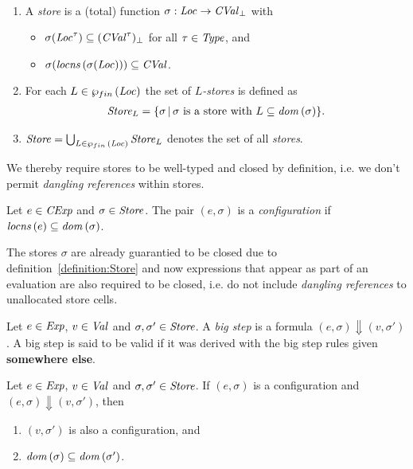 \documentclass[12pt,a4paper]{report}
\newcommand{\CExp}{\nstyle{CExp}}
\newcommand{\CVal}{\nstyle{CVal}}
\begin{document}
\begin{definition}[Store] \label{definition:Store} \
  \begin{enumerate}
    \item A {\em store} is a (total) function $\sigma:\Loc \to \CVal_\bot$ with
          \begin{itemize}
            \item $\sigma(\Loc^\tau) \subseteq (\CVal^\tau)_\bot$ for all $\tau \in \mathit{Type}$, and
            \item $\sigma(\locns{\sigma(\Loc)}) \subseteq \CVal$.
          \end{itemize}

    \item For each $L\in\wp_{fin}\,(\mathit{Loc})$ the set of {\em $L$-stores} is defined as
          \[\begin{array}{l}
            \mathit{Store}_L = \{\sigma\,|\,\text{$\sigma$ is a store with $L\subseteq\mathit{dom}\,(\sigma)$}\}.
          \end{array}\]

    \item $\mathit{Store} = \bigcup_{L\in\wp_{fin}\,(\mathit{Loc})} \mathit{Store}_L$ denotes the set of all {\em stores}.
  \end{enumerate}
\end{definition}

We thereby require stores to be well-typed and closed by definition, i.e. we don't permit {\em dangling
references} within stores.

\begin{definition}[Configuration]
  Let $e\in\CExp$ and $\sigma\in\mathit{Store}$. The pair $(e,\sigma)$ is a {\em configuration}
  if $\mathit{locns}\,(e) \subseteq \mathit{dom}\,(\sigma)$.
\end{definition}

The stores $\sigma$ are already guarantied to be closed due to definition~\ref{definition:Store} and
now expressions that appear as part of an evaluation are also required to be closed, i.e. do not
include {\em dangling references} to unallocated store cells.

\begin{definition}
  Let $e\in\mathit{Exp}$, $v\in\mathit{Val}$ and $\sigma,\sigma'\in\mathit{Store}$. A {\em big step} is a formula
  $(e,\sigma) \Downarrow (v,\sigma')$. A big step is said to be valid if it was derived with the
  big step rules given {\bf somewhere else}.
\end{definition}

\begin{corollary}
  Let $e\in\mathit{Exp}$, $v\in\mathit{Val}$ and $\sigma,\sigma'\in\mathit{Store}$. If $(e,\sigma)$ is a configuration
  and $(e,\sigma) \Downarrow (v,\sigma')$, then
  \begin{enumerate}
    \item $(v,\sigma')$ is also a configuration, and
    \item $\mathit{dom}\,(\sigma) \subseteq \mathit{dom}\,(\sigma')$.
  \end{enumerate}
\end{corollary}
\end{document}
